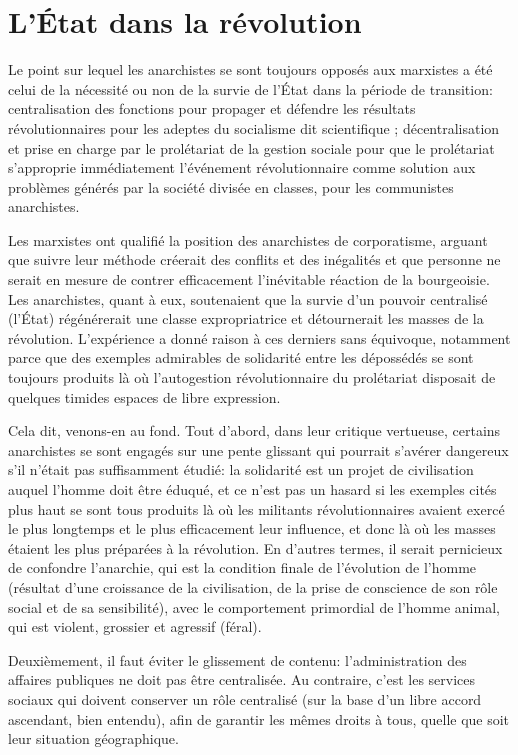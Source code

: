 \section{L'État dans la révolution}

Le point sur lequel les anarchistes se sont toujours opposés aux marxistes a été celui de la nécessité ou non de la survie de l'État dans la période de transition: centralisation des fonctions pour propager et défendre les résultats révolutionnaires pour les adeptes du socialisme dit scientifique ; décentralisation et prise en charge par le prolétariat de la gestion sociale pour que le prolétariat s'approprie immédiatement l'événement révolutionnaire comme solution aux problèmes générés par la société divisée en classes, pour les communistes anarchistes.

Les marxistes ont qualifié la position des anarchistes de corporatisme, arguant que suivre leur méthode créerait des conflits et des inégalités et que personne ne serait en mesure de contrer efficacement l'inévitable réaction de la bourgeoisie. Les anarchistes, quant à eux, soutenaient que la survie d'un pouvoir centralisé (l'État) régénérerait une classe expropriatrice et détournerait les masses de la révolution. L'expérience a donné raison à ces derniers sans équivoque, notamment parce que des exemples admirables de solidarité entre les dépossédés se sont toujours produits là où l'autogestion révolutionnaire du prolétariat disposait de quelques timides espaces de libre expression.

Cela dit, venons-en au fond. Tout d'abord, dans leur critique vertueuse, certains anarchistes se sont engagés sur une pente glissant qui pourrait s'avérer dangereux s'il n'était pas suffisamment étudié: la solidarité est un projet de civilisation auquel l'homme doit être éduqué, et ce n'est pas un hasard si les exemples cités plus haut se sont tous produits là où les militants révolutionnaires avaient exercé le plus longtemps et le plus efficacement leur influence, et donc là où les masses étaient les plus préparées à la révolution. En d'autres termes, il serait pernicieux de confondre l'anarchie, qui est la condition finale de l'évolution de l'homme (résultat d'une croissance de la civilisation, de la prise de conscience de son rôle social et de sa sensibilité), avec le comportement primordial de l'homme animal, qui est violent, grossier et agressif (féral).

Deuxièmement, il faut éviter le glissement de contenu: l'administration des affaires publiques ne doit pas être centralisée. Au contraire, c’est les services sociaux qui doivent conserver un rôle centralisé (sur la base d'un libre accord ascendant, bien entendu), afin de garantir les mêmes droits à tous, quelle que soit leur situation géographique.

